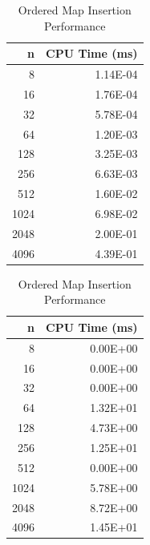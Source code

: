 \documentclass{article}
\begin{document}
\FloatBarrier
\begin{table}[h]
    \centering
    \begin{minipage}{0.48\textwidth}
        \centering
        \caption{Skip List Insertion Performance}
        \begin{tabular}{rr}
            \toprule
            \textbf{n} & \textbf{CPU Time (ms)} \\
            \midrule
            8       & 1.14E-04  \\
            16      & 1.76E-04  \\
            32      & 5.78E-04  \\
            64      & 1.20E-03  \\
            128     & 3.25E-03  \\
            256     & 6.63E-03  \\
            512     & 1.60E-02  \\
            1024    & 6.98E-02  \\
            2048    & 2.00E-01  \\
            4096    & 4.39E-01  \\
            \bottomrule
        \end{tabular}
        \label{tab:sl_insertion}
    \end{minipage}%
    \hfill
    \begin{minipage}{0.48\textwidth}
        \centering
        \caption{Ordered Map Insertion Performance}
        \begin{tabular}{rr}
            \toprule
            \textbf{n} & \textbf{CPU Time (ms)} \\
            \midrule
            8       & 0.00E+00  \\
            16      & 0.00E+00  \\
            32      & 0.00E+00  \\
            64      & 1.32E+01  \\
            128     & 4.73E+00  \\
            256     & 1.25E+01  \\
            512     & 0.00E+00  \\
            1024    & 5.78E+00  \\
            2048    & 8.72E+00  \\
            4096    & 1.45E+01  \\
            \bottomrule
        \end{tabular}
        \label{tab:om_insertion}
    \end{minipage}
\end{table}
\end{document}
